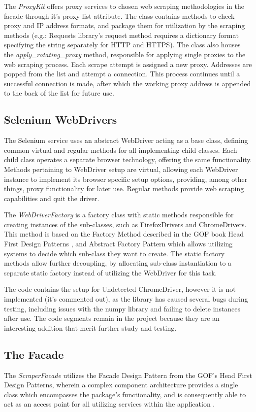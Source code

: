 \documentclass{thesis-ekf}
\theoremstyle{definition}
\theoremstyle{remark}
\begin{document}
The \emph{ProxyKit} offers proxy services to chosen web scraping methodologies in the facade through it's proxy list attribute. The class contains methods to check proxy and IP address formats, and package them for utilization by the scraping methods (e.g.: Requests library's request method requires a dictionary format specifying the string separately for HTTP and HTTPS). The class also houses the \emph{apply\_rotating\_proxy} method, responsible for applying single proxies to the web scraping process. Each scrape attempt is assigned a new proxy. Addresses are popped from the list and attempt a connection. This process continues until a successful connection is made, after which the working proxy address is appended to the back of the list for future use.

\subsection{Selenium WebDrivers}
The Selenium service uses an abstract WebDriver acting as a base class, defining common virtual and regular methods for all implementing child classes. Each child class operates a separate browser technology, offering the same functionality. Methods pertaining to WebDriver setup are virtual, allowing each WebDriver instance to implement its browser specific setup options, providing, among other things, proxy functionality for later use. Regular methods provide web scraping capabilities and quit the driver.

The \emph{WebDriverFactory} is a factory class with static methods responsible for creating instances of the sub-classes, such as FirefoxDrivers and ChromeDrivers. This method is based on the Factory Method described in the GOF book Head First Design Patterns \cite[p.~134]{GOF}, and Abstract Factory Pattern \cite[p.~156]{GOF} which allows utilizing systems to decide which sub-class they want to create. The static factory methods allow further decoupling, by allocating sub-class instantiation to a separate static factory instead of utilizing the WebDriver for this task.

The code contains the setup for Undetected ChromeDriver, however it is not implemented (it's commented out), as the library has caused several bugs during testing, including issues with the numpy library and failing to delete instances after use. The code segments remain in the project because they are an interesting addition that merit further study and testing.

\subsection{The Facade}
The \emph{ScraperFacade} utilizes the Facade Design Pattern from the GOF's Head First Design Patterns, wherein a complex component architecture provides a single class which encompasses the package's functionality, and is consequently able to act as an access point for all utilizing services within the application \cite[p.~264]{GOF}. 
\end{document}
